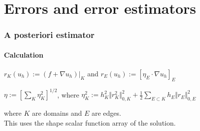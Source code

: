 \documentclass[mathserif]{beamer}
\begin{document}
\section{Errors and error estimators}

\begin{frame}
	\frametitle{A posteriori estimator}
	\framesubtitle{Calculation}
	
$r_K(u_h) := (f+ \nabla u_h)\vert_K$ and $r_E(u_h) := \left[\eta_E \cdot \nabla u_h \right]_E$
	
$\eta := \left[\sum_K \eta_K^2 \right]^{1/2}$, where $\eta_K^2 := h_K^2 \Vert r_K^2 \Vert_{0,K}^2 + \frac{1}{2} \sum_{E \subset K} h_E \Vert r_E \Vert^2_{0,E}$

where $K$ are domains and $E$ are edges.\\
This uses the shape scalar function array of the solution.	
	
\end{frame}
\end{document}
